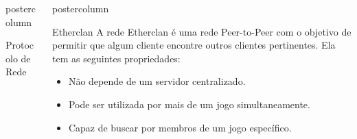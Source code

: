 \documentclass[final]{beamer}
\newlength{\columnheight}
\begin{document}
\begin{frame}
\begin{columns}
\begin{column}{.5\textwidth}
\begin{beamercolorbox}[center,wd=\textwidth]{postercolumn}
\begin{minipage}[T]{.95\textwidth}
{\begin{block}{Protocolo de Rede}
                \vspace*{0.2cm} 
            \end{block}
          }
        \end{minipage}
      \end{beamercolorbox}
    \end{column}

    \begin{column}{.5\textwidth}
      \begin{beamercolorbox}[center,wd=\textwidth]{postercolumn}
        \begin{minipage}[T]{.95\textwidth} %
          \parbox[t][\columnheight]{\textwidth}{ %
            
            \vspace*{0.8cm}
            
            \begin{block}{Etherclan}
                A rede Etherclan é uma rede Peer-to-Peer com o objetivo de permitir que algum cliente
                encontre outros clientes
                pertinentes. Ela tem as seguintes propriedades:
                
                \begin{itemize}
                  \item Não depende de um servidor centralizado.
                  \item Pode ser utilizada por mais de um jogo simultaneamente.
                  \item Capaz de buscar por membros de um jogo específico.
                \end{itemize}
                

\end{block}}
\end{minipage}
\end{beamercolorbox}
\end{column}
\end{columns}
\end{frame}
\end{document}
